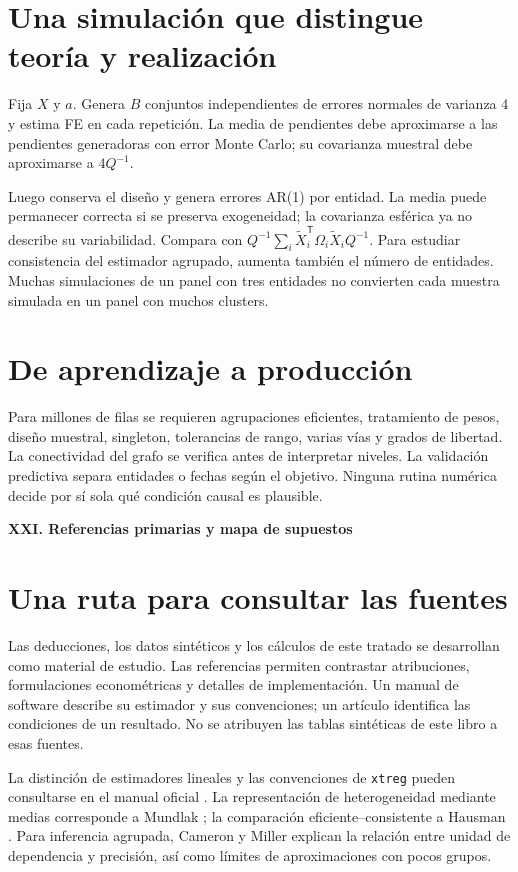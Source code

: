 \documentclass[11pt,a4paper]{article}
\newcommand{\T}{^{\mathsf T}}
\theoremstyle{definition}
\newcommand{\parte}[1]{\par\bigskip\Needspace{8\baselineskip}\begin{center}{\Large\bfseries\color{azul}#1}\end{center}}
\begin{document}
\section{Una simulación que distingue teoría y realización}
Fija $X$ y $a$. Genera $B$ conjuntos independientes de errores normales de varianza $4$ y estima FE en cada repetición. La media de pendientes debe aproximarse a las pendientes generadoras con error Monte Carlo; su covarianza muestral debe aproximarse a $4Q^{-1}$.

Luego conserva el diseño y genera errores AR(1) por entidad. La media puede permanecer correcta si se preserva exogeneidad; la covarianza esférica ya no describe su variabilidad. Compara con $Q^{-1}\sum_i\widetilde X_i\T\Omega_i\widetilde X_iQ^{-1}$. Para estudiar consistencia del estimador agrupado, aumenta también el número de entidades. Muchas simulaciones de un panel con tres entidades no convierten cada muestra simulada en un panel con muchos clusters.

\section{De aprendizaje a producción}
Para millones de filas se requieren agrupaciones eficientes, tratamiento de pesos, diseño muestral, singleton, tolerancias de rango, varias vías y grados de libertad. La conectividad del grafo se verifica antes de interpretar niveles. La validación predictiva separa entidades o fechas según el objetivo. Ninguna rutina numérica decide por sí sola qué condición causal es plausible.



\parte{XXI. Referencias primarias y mapa de supuestos}
\section{Una ruta para consultar las fuentes}
Las deducciones, los datos sintéticos y los cálculos de este tratado se desarrollan como material de estudio. Las referencias permiten contrastar atribuciones, formulaciones econométricas y detalles de implementación. Un manual de software describe su estimador y sus convenciones; un artículo identifica las condiciones de un resultado. No se atribuyen las tablas sintéticas de este libro a esas fuentes.

La distinción de estimadores lineales y las convenciones de \texttt{xtreg} pueden consultarse en el manual oficial \cite{stata}. La representación de heterogeneidad mediante medias corresponde a Mundlak \cite{mundlak}; la comparación eficiente--consistente a Hausman \cite{hausman}. Para inferencia agrupada, Cameron y Miller \cite{cluster} explican la relación entre unidad de dependencia y precisión, así como límites de aproximaciones con pocos grupos.
\end{document}

